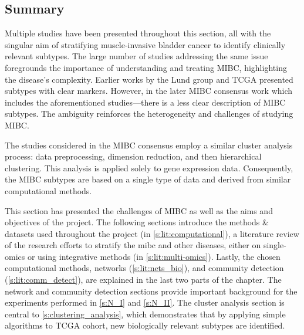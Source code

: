 
\subsection{Summary}

Multiple studies have been presented throughout this section, all with the singular aim of stratifying muscle-invasive bladder cancer to identify clinically relevant subtypes. The large number of studies addressing the same issue foregrounds the importance of understanding and treating MIBC, highlighting the disease's complexity. Earlier works by the Lund group \citep{Sjodahl2017-xr,Marzouka2018-ge} and TCGA \citep{Tcga2014-dr,Robertson2017-mg} presented subtypes with clear markers. However, in the later MIBC consensus work \citep{Kamoun2020-tj} which includes the aforementioned studies—there is a less clear description of MIBC subtypes. The ambiguity reinforces the heterogeneity and challenges of studying MIBC.

The studies considered in the MIBC consensus employ a similar cluster analysis process: data preprocessing, dimension reduction, and then hierarchical clustering. This analysis is applied solely to gene expression data. Consequently, the MIBC subtypes are based on a single type of data and derived from similar computational methods.


This section has presented the challenges of MIBC as well as the aims and objectives of the project. The following sections introduce the methods \& datasets used throughout the project (in \cref{s:lit:computational}), a literature review of the research efforts to stratify the \acrshort{mibc} and other diseases, either on single-omics or using integrative methods (in \cref{s:lit:multi-omics}). Lastly, the chosen computational methods, networks (\cref{s:lit:nets_bio}), and community detection (\cref{s:lit:comm_detect}), are explained in the last two parts of the chapter. The network and community detection sections provide important background for the experiments performed in \cref{s:N_I} and \cref{s:N_II}. The cluster analysis section is central to \cref{s:clustering_analysis}, which demonstrates that by applying simple algorithms to TCGA cohort, new biologically relevant subtypes are identified.



